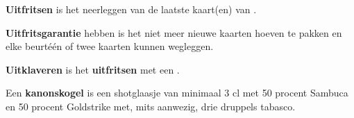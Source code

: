 \item \label{definitie:uitfritsen} \textbf{Uitfritsen} is het neerleggen van de laatste kaart(en) van \eenSpelerN.

\item  \label{definitie:uitfritsgarantie} \textbf{Uitfritsgarantie} hebben is het niet meer nieuwe kaarten hoeven te pakken en elke beurt\footnotemark[1] \'e\'en of twee kaarten kunnen wegleggen.

\item \label{definitie:uitklaver} \textbf{Uitklaveren} is het \textbf{uitfritsen} met een \footnotemark[4].

\item \label{definitie:kanonskogel} Een \textbf{kanonskogel} is een shotglaasje van minimaal 3 cl met 50 procent Sambuca en 50 procent Goldstrike met, mits aanwezig, drie druppels tabasco.

\eindABCLijst

